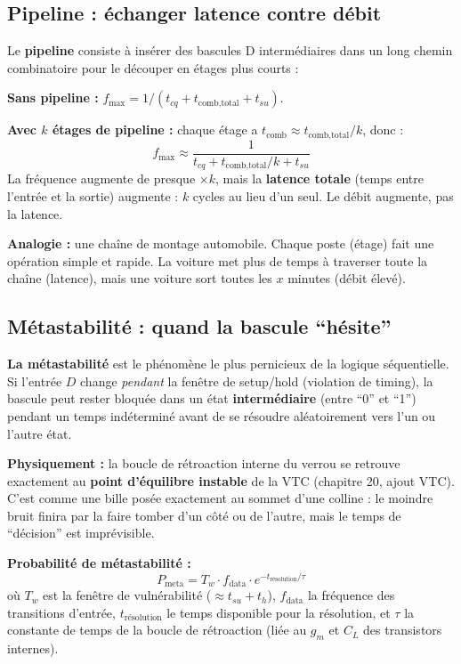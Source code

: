 \documentclass[12pt,a4paper,twoside]{book}
\begin{document}
\subsection{Pipeline : échanger latence contre débit}

\begin{formule}
Le \textbf{pipeline} consiste à insérer des bascules D intermédiaires dans un long chemin combinatoire pour le découper en étages plus courts :

\textbf{Sans pipeline :} $f_{\max} = 1/(t_{cq} + t_{\text{comb,total}} + t_{su})$.

\textbf{Avec $k$ étages de pipeline :} chaque étage a $t_{\text{comb}} \approx t_{\text{comb,total}}/k$, donc :
\[
f_{\max} \approx \frac{1}{t_{cq} + t_{\text{comb,total}}/k + t_{su}}
\]
La fréquence augmente de presque $\times k$, mais la \textbf{latence totale} (temps entre l'entrée et la sortie) augmente : $k$ cycles au lieu d'un seul. Le débit augmente, pas la latence.
\end{formule}

\begin{intuition}
\textbf{Analogie :} une chaîne de montage automobile. Chaque poste (étage) fait une opération simple et rapide. La voiture met plus de temps à traverser toute la chaîne (latence), mais une voiture sort toutes les $x$ minutes (débit élevé).
\end{intuition}

\subsection{Métastabilité : quand la bascule ``hésite''}

\begin{attention}
\textbf{La métastabilité} est le phénomène le plus pernicieux de la logique séquentielle. Si l'entrée $D$ change \textit{pendant} la fenêtre de setup/hold (violation de timing), la bascule peut rester bloquée dans un état \textbf{intermédiaire} (entre ``0'' et ``1'') pendant un temps indéterminé avant de se résoudre aléatoirement vers l'un ou l'autre état.
\end{attention}

\begin{formule}
\textbf{Physiquement :} la boucle de rétroaction interne du verrou se retrouve exactement au \textbf{point d'équilibre instable} de la VTC (chapitre 20, ajout VTC). C'est comme une bille posée exactement au sommet d'une colline : le moindre bruit finira par la faire tomber d'un côté ou de l'autre, mais le temps de ``décision'' est imprévisible.

\textbf{Probabilité de métastabilité :}
\[
P_{\text{meta}} = T_w \cdot f_{\text{data}} \cdot e^{-t_{\text{résolution}}/\tau}
\]
où $T_w$ est la fenêtre de vulnérabilité ($\approx t_{su} + t_h$), $f_{\text{data}}$ la fréquence des transitions d'entrée, $t_{\text{résolution}}$ le temps disponible pour la résolution, et $\tau$ la constante de temps de la boucle de rétroaction (liée au $g_m$ et $C_L$ des transistors internes).
\end{formule}
\end{document}
